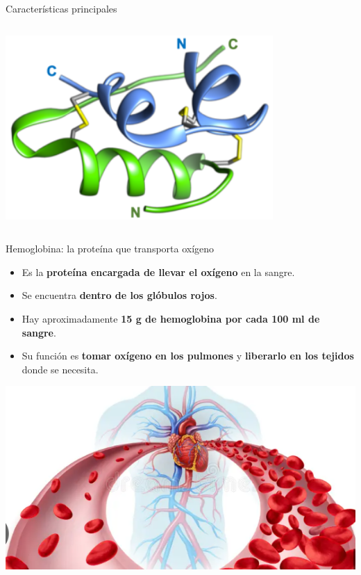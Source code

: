 \documentclass[
  ignorenonframetext,
]{beamer}
\providecommand{\tightlist}{%
  \setlength{\itemsep}{0pt}\setlength{\parskip}{0pt}}
\begin{document}
\begin{frame}{Características principales}
\begin{columns}[T]
\begin{column}{0.33\linewidth}
\includegraphics[width=0.7\linewidth,height=\textheight,keepaspectratio]{insulina.png}
\end{column}
\end{columns}
\end{frame}

\begin{frame}{Hemoglobina: la proteína que transporta oxígeno}
\label{hemoglobina-la-proteuxedna-que-transporta-oxuxedgeno}
\begin{itemize}
\tightlist
\item
  Es la \textbf{proteína encargada de llevar el oxígeno} en la sangre.
\item
  Se encuentra \textbf{dentro de los glóbulos rojos}.
\item
  Hay aproximadamente \textbf{15 g de hemoglobina por cada 100 ml de
  sangre}.
\item
  Su función es \textbf{tomar oxígeno en los pulmones} y
  \textbf{liberarlo en los tejidos} donde se necesita.
\end{itemize}

\begin{center}
\includegraphics[width=0.45\linewidth,height=\textheight,keepaspectratio]{pulmon.png}
\end{center}
\end{frame}
\end{document}
